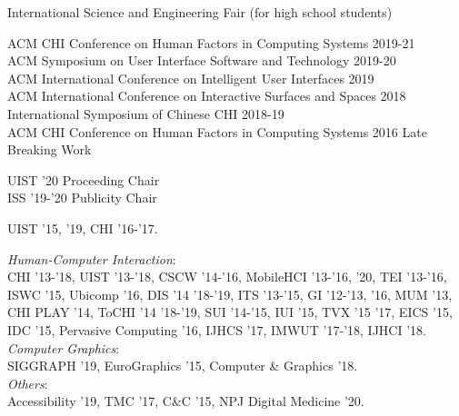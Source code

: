 

 {
	 {
			International Science and Engineering Fair (for high school students)
		}
}

 {
}

 {
	 {
		ACM CHI Conference on Human Factors in Computing Systems 2019-21\\
		ACM Symposium on User Interface Software and Technology 2019-20\\
		ACM International Conference on Intelligent User Interfaces 2019\\
		ACM International Conference on Interactive Surfaces and Spaces 2018\\
		International Symposium of Chinese CHI 2018-19\\
		ACM CHI Conference on Human Factors in Computing Systems 2016 Late Breaking Work
	}
}

 {
	 {
		UIST '20 Proceeding Chair\\
		ISS '19-'20 Publicity Chair\\
	}
}

 {
	 {
		UIST '15, '19, CHI '16-'17.
	}
}

 {
	 {
	\textit{Human-Computer Interaction}:\\
		CHI '13-'18, UIST '13-'18, CSCW '14-'16, MobileHCI '13-'16, '20, TEI '13-'16, ISWC '15, Ubicomp '16, DIS '14 '18-'19, ITS '13-'15, GI '12-'13, '16, MUM '13, CHI PLAY '14, ToCHI '14 '18-'19, SUI '14-'15, IUI '15, TVX '15 '17, EICS '15, IDC '15, Pervasive Computing '16, IJHCS '17, IMWUT '17-'18, IJHCI '18. \vspace{0.5em}\\
		\textit{Computer Graphics}:\\
		SIGGRAPH '19,  EuroGraphics '15, Computer \& Graphics '18. \vspace{0.5em}\\
		\textit{Others}:\\
		Accessibility '19, TMC '17, C\&C '15, NPJ Digital Medicine '20.
	}
}

